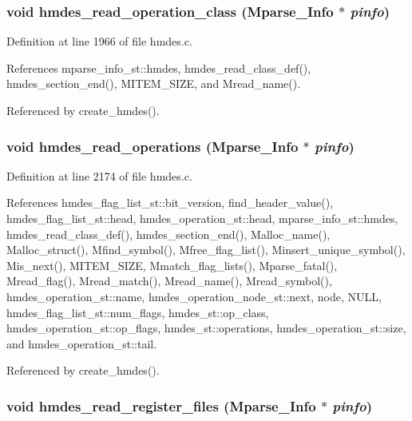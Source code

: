 \subsubsection{\setlength{\rightskip}{0pt plus 5cm}void hmdes\_\-read\_\-operation\_\-class (\bf{Mparse\_\-Info} $\ast$ {\em pinfo})}\label{hmdes_8c_db94157699c98fc24e869b0a9bf62d27}




Definition at line 1966 of file hmdes.c.

References mparse\_\-info\_\-st::hmdes, hmdes\_\-read\_\-class\_\-def(), hmdes\_\-section\_\-end(), MITEM\_\-SIZE, and Mread\_\-name().

Referenced by create\_\-hmdes().
\subsubsection{\setlength{\rightskip}{0pt plus 5cm}void hmdes\_\-read\_\-operations (\bf{Mparse\_\-Info} $\ast$ {\em pinfo})}\label{hmdes_8c_59ea256e06da9fa9c177ec00dd71a4da}




Definition at line 2174 of file hmdes.c.

References hmdes\_\-flag\_\-list\_\-st::bit\_\-version, find\_\-header\_\-value(), hmdes\_\-flag\_\-list\_\-st::head, hmdes\_\-operation\_\-st::head, mparse\_\-info\_\-st::hmdes, hmdes\_\-read\_\-class\_\-def(), hmdes\_\-section\_\-end(), Malloc\_\-name(), Malloc\_\-struct(), Mfind\_\-symbol(), Mfree\_\-flag\_\-list(), Minsert\_\-unique\_\-symbol(), Mis\_\-next(), MITEM\_\-SIZE, Mmatch\_\-flag\_\-lists(), Mparse\_\-fatal(), Mread\_\-flag(), Mread\_\-match(), Mread\_\-name(), Mread\_\-symbol(), hmdes\_\-operation\_\-st::name, hmdes\_\-operation\_\-node\_\-st::next, node, NULL, hmdes\_\-flag\_\-list\_\-st::num\_\-flags, hmdes\_\-st::op\_\-class, hmdes\_\-operation\_\-st::op\_\-flags, hmdes\_\-st::operations, hmdes\_\-operation\_\-st::size, and hmdes\_\-operation\_\-st::tail.

Referenced by create\_\-hmdes().
\subsubsection{\setlength{\rightskip}{0pt plus 5cm}void hmdes\_\-read\_\-register\_\-files (\bf{Mparse\_\-Info} $\ast$ {\em pinfo})}\label{hmdes_8c_6151685cbaff3a77aa055033dfc491da}




